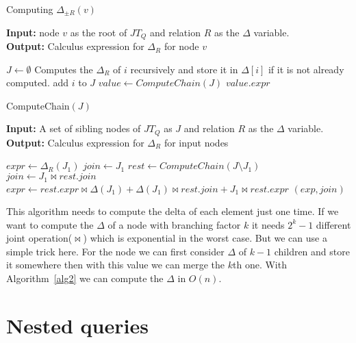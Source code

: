 \documentclass[12pt]{article}
\begin{document}
\begin{algorithm}[H]
\caption{Computing $\Delta_{\pm R}(v)$} 
\label{alg1}
\textbf{Input:} node $v$ as the root of $JT_{Q}$ and relation $R$ as the $\Delta$ variable.\\
\textbf{Output:} Calculus expression for $\Delta_{R}$ for node $v$
\begin{algorithmic}[1]
\STATE $J\gets \emptyset$
\STATE Computes the $\Delta_{R}$ of $i$ recursively and store it in $\Delta[i]$ if it is not already computed.
\STATE add $i$ to $J$
\ENDIF
\ENDFOR
\STATE $value\gets ComputeChain(J)$
\RETURN $value.expr$
\end{algorithmic}
\end{algorithm}

\begin{algorithm}[H]
\caption{ComputeChain$(J)$} 
\label{alg2}
\textbf{Input:} A set of sibling nodes of $JT_{Q}$ as $J$ and relation $R$ as the $\Delta$ variable.\\
\textbf{Output:} Calculus expression for $\Delta_{R}$ for input nodes\\
\begin{algorithmic}[1]
\STATE $expr\gets \Delta_{R}(J_{1})$ 
\STATE $join\gets J_{1}$
\ELSE
\STATE $rest\gets ComputeChain(J\setminus J_{1})$
\STATE $join\gets J_{1}\Join rest.join$
\STATE $expr\gets rest.expr\Join \Delta(J_{1})+\Delta(J_{1})\Join rest.join+J_{1}\Join rest.expr$
\ENDIF
\RETURN $(exp,join)$
\end{algorithmic}
\end{algorithm}

This algorithm needs to compute the delta of each element just one time. If we want to compute the $\Delta$ of a node with branching factor $k$ it needs $2^{k}-1$ different joint operation($\Join$) which is exponential in the worst case. But we can use a simple trick here. For the node we can first consider $\Delta$ of $k-1$ children and store it somewhere then with this value we can merge the $k$th one. With Algorithm~\ref{alg2} we can compute the $\Delta$ in $O(n)$.


\section{Nested queries}
\end{document}
